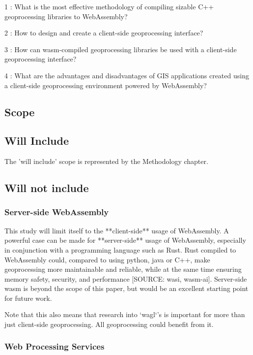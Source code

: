 1 : What is the most effective methodology of compiling sizable C++ geoprocessing libraries to WebAssembly?

2 : How to design and create a client-side geoprocessing interface?

3 : How can wasm-compiled geoprocessing libraries be used with a client-side geoprocessing interface?

4 : What are the advantages and disadvantages of GIS applications created using a client-side geoprocessing environment powered by WebAssembly?

\newpage
\subsection{Scope}


\subsection*{Will Include}

The 'will include' scope is represented by the Methodology chapter. 

\subsection*{Will not include}

\subsubsection*{Server-side WebAssembly} %

This study will limit itself to the **client-side** usage of WebAssembly. 
A powerful case can be made for **server-side** usage of WebAssembly, especially in conjunction with a programming language such as Rust. 
Rust compiled to WebAssembly could, compared to using python, java or C++, make geoprocessing more maintainable and reliable, while at the same time ensuring memory safety, security, and performance [SOURCE: wasi, wasm-ai]. 
Server-side wasm is beyond the scope of this paper, but would be an excellent starting point for future work. 

Note that this also means that research into `wagl`'s is important for more than just client-side geoprocessing. All geoprocessing could benefit from it.



\subsubsection*{Web Processing Services} %

